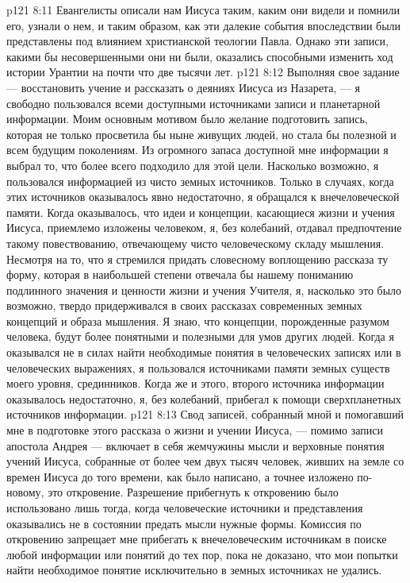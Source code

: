 \vs p121 8:11 \pc Евангелисты описали нам Иисуса таким, каким они видели и помнили его, узнали о нем, и таким образом, как эти далекие события впоследствии были представлены под влиянием христианской теологии Павла. Однако эти записи, какими бы несовершенными они ни были, оказались способными изменить ход истории Урантии на почти что две тысячи лет.
\vsetoff
\vs p121 8:12  Выполняя свое задание --- восстановить учение и рассказать о деяниях Иисуса из Назарета, --- я свободно пользовался всеми доступными источниками записи и планетарной информации. Моим основным мотивом было желание подготовить запись, которая не только просветила бы ныне живущих людей, но стала бы полезной и всем будущим поколениям. Из огромного запаса доступной мне информации я выбрал то, что более всего подходило для этой цели. Насколько возможно, я пользовался информацией из чисто земных источников. Только в случаях, когда этих источников оказывалось явно недостаточно, я обращался к внечеловеческой памяти. Когда оказывалось, что идеи и концепции, касающиеся жизни и учения Иисуса, приемлемо изложены человеком, я, без колебаний, отдавал предпочтение такому повествованию, отвечающему чисто человеческому складу мышления. Несмотря на то, что я стремился придать словесному воплощению рассказа ту форму, которая в наибольшей степени отвечала бы нашему пониманию подлинного значения и ценности жизни и учения Учителя, я, насколько это было возможно, твердо придерживался в своих рассказах современных земных концепций и образа мышления. Я знаю, что концепции, порожденные разумом человека, будут более понятными и полезными для умов других людей. Когда я оказывался не в силах найти необходимые понятия в человеческих записях или в человеческих выражениях, я пользовался источниками памяти земных существ моего уровня, срединников. Когда же и этого, второго источника информации оказывалось недостаточно, я, без колебаний, прибегал к помощи сверхпланетных источников информации.
\vs p121 8:13 Свод записей, собранный мной и помогавший мне в подготовке этого рассказа о жизни и учении Иисуса, --- помимо записи апостола Андрея --- включает в себя жемчужины мысли и верховные понятия учений Иисуса, собранные от более чем двух тысяч человек, живших на земле со времен Иисуса до того времени, как было написано, а точнее изложено по\hyp{}новому, это откровение. Разрешение прибегнуть к откровению было использовано лишь тогда, когда человеческие источники и представления оказывались не в состоянии предать мысли нужные формы. Комиссия по откровению запрещает мне прибегать к внечеловеческим источникам в поиске любой информации или понятий до тех пор, пока не доказано, что мои попытки найти необходимое понятие исключительно в земных источниках не удались.
